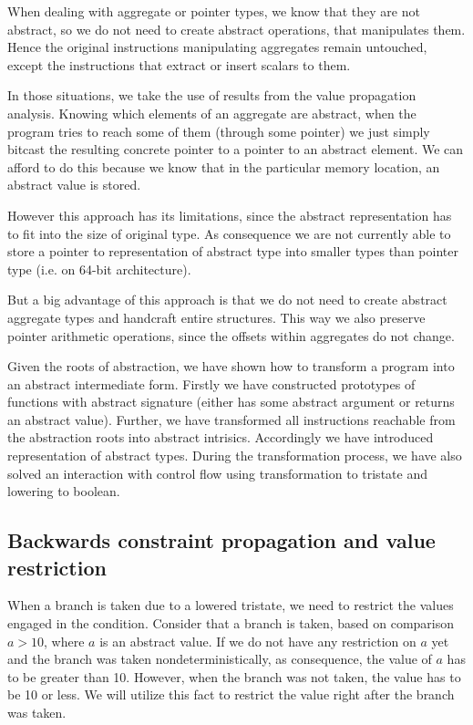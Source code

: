When dealing with aggregate or pointer types, we know that they are not
abstract, so we do not need to create abstract operations, that manipulates
them. Hence the original instructions manipulating aggregates remain
untouched, except the instructions that extract or insert scalars to them.

In those situations, we take the use of results from the value propagation analysis.
Knowing which elements of an aggregate are abstract, when the program tries to
reach some of them (through some pointer) we just simply bitcast
the resulting concrete pointer to a pointer to an abstract element. We can afford
to do this because we know that in the particular memory location, an abstract value is
stored.

However this approach has its limitations, since the abstract representation has
to fit into the size of original type. As consequence we are not currently able
to store a pointer to representation of abstract type into smaller types than
pointer type (i.e.  on 64-bit architecture).

But a big advantage of this approach is that we do not need to create
abstract aggregate types and handcraft entire structures. This way we also
preserve pointer arithmetic operations, since the offsets within
aggregates do not change.

\begin{summary}
Given the roots of abstraction, we have shown how to transform a program into an
abstract intermediate form. Firstly we have constructed prototypes of
functions with abstract signature (either has some abstract argument or
returns an abstract value). Further, we have transformed all instructions
reachable from the abstraction roots into abstract intrisics. Accordingly we
have introduced representation of abstract types. During the transformation
process, we have also solved an interaction with control flow using
transformation to tristate and lowering to \LLVM boolean.
\end{summary}

\subsection{Backwards constraint propagation and value restriction}
\label{sec:bcp}
When a branch is taken due to a lowered tristate, we need to restrict the values
engaged in the condition. Consider that a branch is taken, based on comparison $a
> 10$, where $a$ is an abstract value. If we do not have any restriction on $a$
yet and the branch was taken nondeterministically, as consequence, the value of $a$
has to be greater than 10. However, when the branch was not taken,
the value has to be 10 or less. We will utilize this fact to restrict the value
right after the branch was taken.

